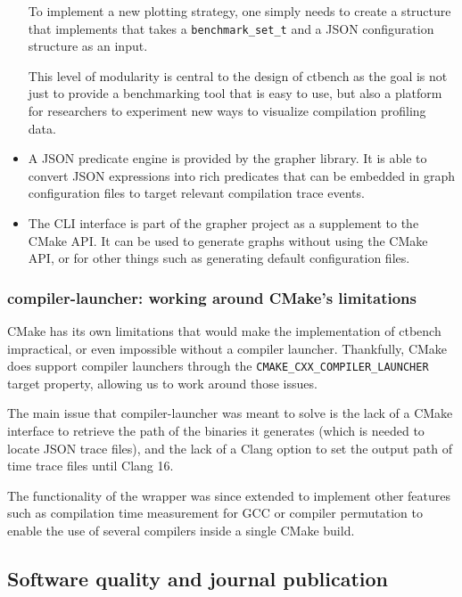 \documentclass[../main]{subfiles}
\begin{document}
\begin{itemize}
  To implement a new plotting strategy, one simply needs to create a structure
  that implements that takes a \lstinline{benchmark_set_t} and a
  JSON configuration structure as an input.

  This level of modularity is central to the design of ctbench
  as the goal is not just to provide a benchmarking tool that is easy to use,
  but also a platform for researchers to experiment new ways to visualize
  compilation profiling data.

\item

  A JSON predicate engine is provided by the grapher library.
  It is able to convert JSON expressions into rich predicates
  that can be embedded in graph configuration files to target
  relevant compilation trace events.

\item

  The CLI interface is part of the grapher project as a supplement
  to the CMake API. It can be used to generate graphs without using
  the CMake API, or for other things such as generating default
  configuration files.

\end{itemize}

\subsubsection{
  compiler-launcher: working around CMake's limitations
}

CMake has its own limitations that would make the implementation of ctbench
impractical, or even impossible without a compiler launcher. Thankfully, CMake
does support compiler launchers through the
\lstinline{CMAKE_CXX_COMPILER_LAUNCHER} target property,
allowing us to work around those issues.

The main issue that compiler-launcher was meant to solve is the lack of
a CMake interface to retrieve the path of the binaries it generates (which is
needed to locate JSON trace files), and the lack of a Clang option to set
the output path of time trace files until Clang 16.

The functionality of the wrapper was since extended to implement other features
such as compilation time measurement for GCC or compiler permutation
to enable the use of several \cpp compilers inside a single CMake build.

\subsection{
  Software quality and journal publication
}
\end{document}
